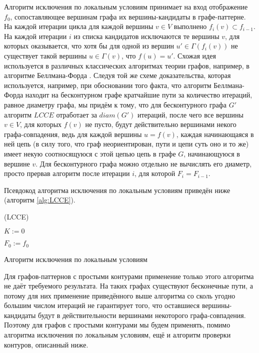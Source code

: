 Алгоритм исключения по локальным условиям принимает на вход отображение $f_0$, сопоставляющее вершинам графа их вершины-кандидаты в графе-паттерне. На каждой итерации цикла для каждой вершины $v \in V$ выполнено $f_{i}(v) \subset f_{i-1}$. На каждой итерации $i$ из списка кандидатов исключаются те вершины $v$, для которых оказывается, что хотя бы для одной из вершин $u' \in \Gamma(f_i(v))$ не существует такой вершины $u \in \Gamma(v)$, что $f(u) = u'$. Схожая идея используется в различных классических алгоритмах теории графов, например, в алгоритме Беллмана-Форда \cite{bellmanford}. Следуя той же схеме доказательства, которая используется, например, при обосновании того факта, что алгоритм Беллмана-Форда находит на бесконтурном графе кратчайшие пути за количество итераций, равное диаметру графа, мы придём к тому, что для бесконтурного графа $G'$ алгоритм $LCCE$ отработает за $diam(G')$ итераций, после чего все вершины $v \in V$, для которых $f(v)$ не пусто, будут действительно вершинами некого графа-совпадения, ведь для каждой вершины $u = f(v)$, каждая начинающаяся в ней цепь (в силу того, что граф неориентирован, пути и цепи суть оно и то же) имеет некую соотносящуюся с этой цепью цепь в графе $G$, начинающуюся в вершине $v$. Для бесконтурного графа можно отдельно не вычислять его диаметр, просто прервав алгоритм после итерации $i$, для которой $F_i = F_{i-1}$.

Псевдокод алгоритма исключения по локальным условиям приведён ниже (алгоритм \ref{alg:LCCE}).

\begin{algorithm}[H]
	\Large
	\Begin(LCCE){
		$K := 0$
		
		$F_0 := f_0$
		
	}

	\caption{Алгоритм исключения по локальным условиям}
	\label{alg:LCCE}
\end{algorithm}

Для графов-паттернов с простыми контурами применение только этого алгоритма не даёт требуемого результата. На таких графах существуют бесконечные пути, а потому для них применение приведённого выше алгоритма со сколь угодно большим числом итераций не гарантирует того, что оставшиеся вершины-кандидаты будут в действительности вершинами некоторого графа-совпадения. Поэтому для графов с простыми контурами мы будем применять, помимо алгоритма исключения по локальным условиям, ещё и алгоритм проверки контуров, описанный ниже.

